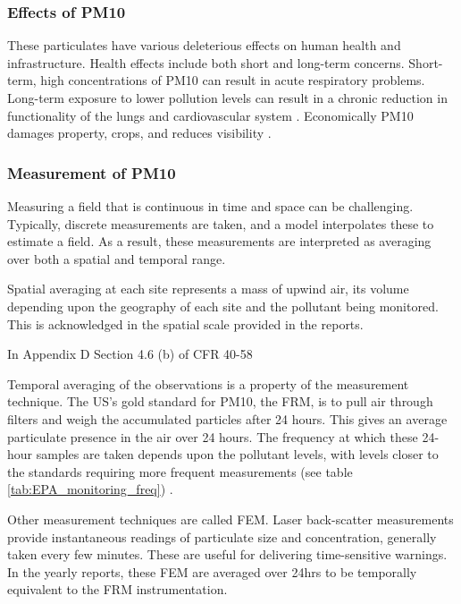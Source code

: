 \documentclass{article}
\begin{document}
\subsubsection*{Effects of PM10}
\label{subsubsec:pm10effects}
These particulates have various deleterious effects on human health and infrastructure.  Health effects include both short and long-term concerns.  Short-term, high concentrations of \ac{PM10} can result in acute respiratory problems.  Long-term exposure to lower pollution levels can result in a chronic reduction in functionality of the lungs and cardiovascular system %
.  Economically \ac{PM10} damages property, crops, and reduces visibility
.

\subsubsection*{Measurement of PM10}
\label{subsubsec:pm10measurement}
Measuring a field that is continuous in time and space can be challenging.  Typically, discrete measurements are taken, and a model interpolates these to estimate a field.  As a result, these measurements are interpreted as averaging over both a spatial and temporal range.

Spatial averaging at each site represents a mass of upwind air, its volume depending upon the geography of each site and the pollutant being monitored.  This is acknowledged in the spatial scale provided in the reports.   

In Appendix D Section 4.6 (b) of CFR 40-58 %


Temporal averaging of the observations is a property of the measurement technique.  The US's gold standard for \ac{PM10}, the \ac{FRM}, is to pull air through filters and weigh the accumulated particles after 24 hours.  This gives an average particulate presence in the air over 24 hours.  The frequency at which these 24-hour samples are taken depends upon the pollutant levels, with levels closer to the standards requiring more frequent measurements (see table \ref{tab:EPA_monitoring_freq}) \citep{CASCAQMD:2015}.

Other measurement techniques are called \ac{FEM}.  Laser back-scatter measurements provide instantaneous readings of particulate size and concentration, generally taken every few minutes.  These are useful for delivering time-sensitive warnings.  In the yearly reports, these \ac {FEM} are averaged over 24hrs to be temporally equivalent to the \ac{FRM} instrumentation.
\end{document}
